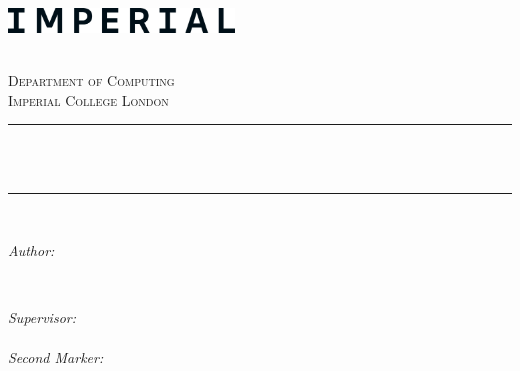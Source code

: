 \begin{titlepage}

\selectfont

\newcommand{\HRule}{\rule{\linewidth}{0.5mm}} %


\includegraphics[width = 6cm]{./figures/imperial2.png}\\[1.5cm] 

\vfill
\center %
 

\textsc{\LARGE \reporttype}\\[1.5cm] 
\textsc{\Large Department of Computing}\\[0.5cm] 
\textsc{\large Imperial College London}\\[0.5cm] 


\HRule \\[0.4cm]
{ \Huge \bfseries \reporttitle } \\[0.2cm] %
\HRule \\[1.5cm]
 

\begin{minipage}{0.4\textwidth}
\begin{flushleft} \large
\emph{Author:}\\
\reportauthor %
\end{flushleft}
\end{minipage}
~
\begin{minipage}{0.4\textwidth}
\begin{flushright} \large
\emph{Supervisor:} \\
\supervisor \\[1em] %
\emph{Second Marker:} \\
\secondmarker \\[1em] %
\end{flushright}
\end{minipage}\\[4cm]


\end{titlepage}
